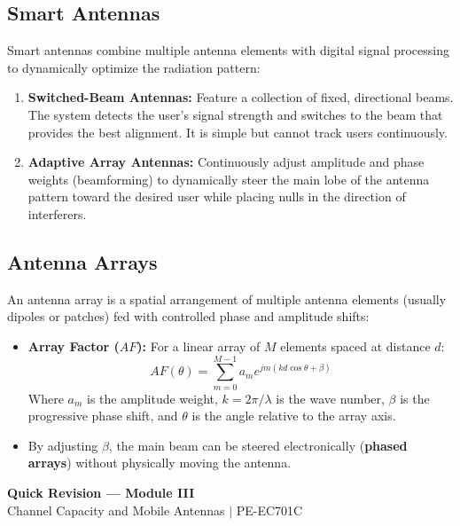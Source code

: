 \documentclass[12pt,a4paper]{article}
\begin{document}
\subsection{Smart Antennas}
Smart antennas combine multiple antenna elements with digital signal processing to dynamically optimize the radiation pattern:
\begin{enumerate}[label=\textbf{\arabic*.}, leftmargin=*, itemsep=3.5pt]
  \item \textbf{Switched-Beam Antennas:} Feature a collection of fixed, directional beams. The system detects the user's signal strength and switches to the beam that provides the best alignment. It is simple but cannot track users continuously.
  \item \textbf{Adaptive Array Antennas:} Continuously adjust amplitude and phase weights (beamforming) to dynamically steer the main lobe of the antenna pattern toward the desired user while placing nulls in the direction of interferers.
\end{enumerate}

\subsection{Antenna Arrays}
An antenna array is a spatial arrangement of multiple antenna elements (usually dipoles or patches) fed with controlled phase and amplitude shifts:
\begin{itemize}[leftmargin=*, itemsep=3pt]
  \item \textbf{Array Factor ($AF$):} For a linear array of $M$ elements spaced at distance $d$:
    \begin{equation}
      AF(\theta) = \sum_{m=0}^{M-1} a_m e^{j m (k d \cos\theta + \beta)}
    \end{equation}
    Where $a_m$ is the amplitude weight, $k = 2\pi/\lambda$ is the wave number, $\beta$ is the progressive phase shift, and $\theta$ is the angle relative to the array axis.
  \item By adjusting $\beta$, the main beam can be steered electronically (\textbf{phased arrays}) without physically moving the antenna.
\end{itemize}

\newpage
\begin{center}
  {\large\bfseries\color{myred} Quick Revision --- Module III}\\[3pt]
  {\small\color{mydark} Channel Capacity and Mobile Antennas $|$ PE-EC701C}
\end{center}
\noindent{\color{myred}\rule{\linewidth}{1.2pt}}
\vspace{4pt}
\end{document}
